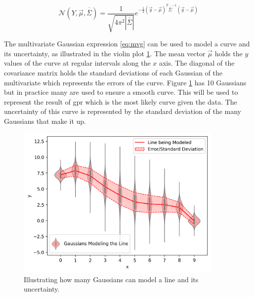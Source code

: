 \begin{equation}
\mathcal{N}(Y, \Vec{\mu}, \overline{\overline{\Sigma}}) = \frac{1}{\sqrt{4\pi^2|\overline{\overline{\Sigma}}|}} e^{{-\frac{1}{2}(\Vec{y}-\Vec{\mu})^T\overline{\overline{\Sigma}}^{-1}(\Vec{y}-\Vec{\mu})}}
\label{eq:mvg}
\end{equation}

The multivariate Gaussian expression \ref{eq:mvg} can be used to model a curve and its uncertainty, as illustrated in the violin plot \ref{fig:mvg}. The mean vector $\Vec{\mu}$ holds the $y$ values of the curve at regular intervals along the $x$ axis. The diagonal of the covariance matrix holds the standard deviations of each Gaussian of the multivariate which represents the errors of the curve. Figure \ref{fig:mvg} has 10 Gaussians but in practice many are used to ensure a smooth curve. This will be used to represent the result of \gls{gpr} which is the most likely curve given the data. The uncertainty of this curve is represented by the standard deviation of the many Gaussians that make it up.  

\begin{figure}
  \centering
  \includegraphics[width=10cm]{images/mvg.png}
  \caption{Illustrating how many Gaussians can model a line and its uncertainty.}
  \label{fig:mvg}
\end{figure}

